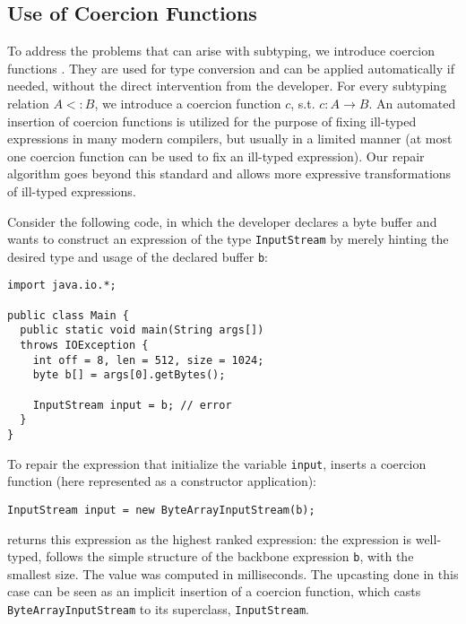 %

\subsection{Use of Coercion Functions}

To address the problems that can arise with subtyping, we introduce 
coercion functions \cite{TannenCoercionS91}. 
They are used for type conversion and can be applied automatically if needed, 
without the direct intervention from the developer. For every subtyping relation $A<:B$, we introduce a coercion function $c$, s.t. $c: A \rightarrow B$. 
An automated insertion of
coercion functions is utilized for the purpose of fixing ill-typed
expressions in many modern compilers, but usually in a limited manner 
(at most one coercion function can be used to fix an ill-typed expression).
Our repair algorithm goes beyond this standard and allows more expressive 
transformations of ill-typed expressions. 

Consider the following code, in which the developer declares a byte buffer and
wants to construct an expression of the type \lstinline{InputStream} by merely hinting
the desired type and usage of the declared buffer \lstinline{b}:
\begin{lstlisting}
import java.io.*;

public class Main {
  public static void main(String args[]) 
  throws IOException {
    int off = 8, len = 512, size = 1024;
    byte b[] = args[0].getBytes();
    
    InputStream input = b; // error
  }
}
\end{lstlisting}

To repair the expression that initialize the variable \lstinline{input}, 
\ourTool inserts a coercion function (here represented as a constructor application):
\begin{lstlisting}    
InputStream input = new ByteArrayInputStream(b);
\end{lstlisting}
\ourTool returns this expression as the highest ranked expression: 
the expression is well-typed, follows the simple structure of the backbone
expression \lstinline{b}, with the smallest size. The value was computed in  
milliseconds. 
The upcasting done in this case can be seen as an implicit insertion of 
a coercion function, which casts \lstinline{ByteArrayInputStream} to
its superclass, \lstinline{InputStream}.

